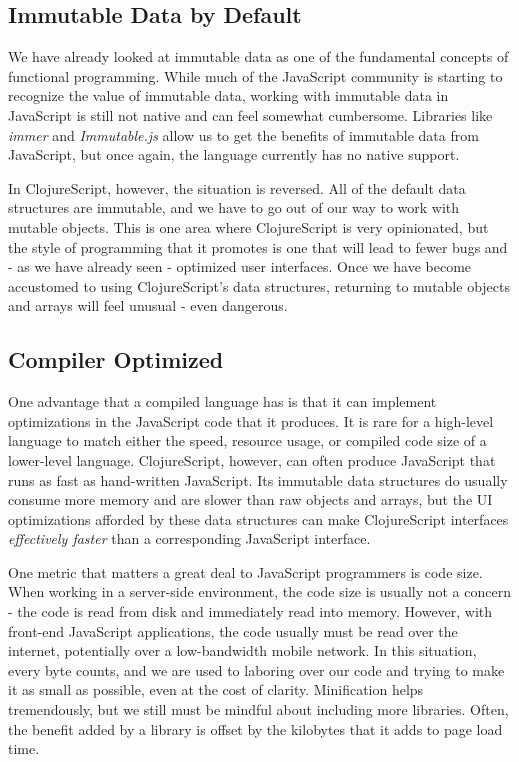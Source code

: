 \documentclass[10pt,twoside,openright]{memoir}
\begin{document}
\subsection{Immutable Data by Default}

We have already looked at immutable data as one of the fundamental
concepts of functional programming. While much of the JavaScript
community is starting to recognize the value of immutable data, working
with immutable data in JavaScript is still not native and can feel
somewhat cumbersome. Libraries like \emph{immer} and \emph{Immutable.js}
allow us to get the benefits of immutable data from JavaScript, but once
again, the language currently has no native support.

In ClojureScript, however, the situation is reversed. All of the default
data structures are immutable, and we have to go out of our way to work
with mutable objects. This is one area where ClojureScript is very
opinionated, but the style of programming that it promotes is one that
will lead to fewer bugs and - as we have already seen - optimized user
interfaces. Once we have become accustomed to using ClojureScript's data
structures, returning to mutable objects and arrays will feel unusual -
even dangerous.

\subsection{Compiler Optimized}

One advantage that a compiled language has is that it can implement
optimizations in the JavaScript code that it produces. It is rare for a
high-level language to match either the speed, resource usage, or
compiled code size of a lower-level language. ClojureScript, however,
can often produce JavaScript that runs as fast as hand-written
JavaScript. Its immutable data structures do usually consume more memory
and are slower than raw objects and arrays, but the UI optimizations
afforded by these data structures can make ClojureScript interfaces
\emph{effectively faster} than a corresponding JavaScript interface.

One metric that matters a great deal to JavaScript programmers is code
size. When working in a server-side environment, the code size is
usually not a concern - the code is read from disk and immediately read
into memory. However, with front-end JavaScript applications, the code
usually must be read over the internet, potentially over a low-bandwidth
mobile network. In this situation, every byte counts, and we are used to
laboring over our code and trying to make it as small as possible, even
at the cost of clarity. Minification helps tremendously, but we still
must be mindful about including more libraries. Often, the benefit added
by a library is offset by the kilobytes that it adds to page load time.
\end{document}
